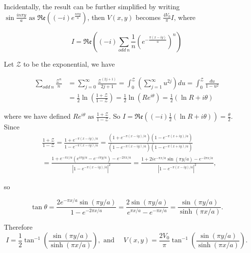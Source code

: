 \documentclass[a4paper,12pt]{report}
\begin{document}
\begin{example_template}
		Incidentally, the result can be further simplified by writing \(\sin \frac{in\pi y}{a} \text{ as } \mathfrak{Re} ((-i)e^{\frac{n\pi y}{a} } )  \), then \(V(x,y)\) becomes \(\frac{4V_0 }{\pi } I\), where
		
		\begin{equation}
			I = \mathfrak{Re} ((-i)\sum_{odd~n}^{} \frac{1}{n} (e^{-\frac{\pi (x-iy)}{a} } )^{n}) \end{equation}
		
		Let \(\mathcal{Z} \) to be the exponential, we have
		
		\begin{equation}
			\begin{aligned}
				\sum_{odd~n}^{} \frac{\mathcal{Z} ^{n} }{n} &= \sum_{j=0}^{\infty} \frac{\mathcal{Z} ^{(2j+1)} }{2j+1} = \int_{0}^{\mathcal{Z} } (\sum_{j=1}^{\infty} u^{2j} )du = \int_{0}^{\mathcal{Z} } \frac{du}{1-u^2} \\
				&= \frac{1}{2} \ln (\frac{1+\mathcal{Z} }{1-\mathcal{Z} } ) = \frac{1}{2}  \ln (R e^{i\theta } ) = \frac{1}{2} (\ln R + i\theta )
			\end{aligned}
		\end{equation}
		
		where we have defined \(R e^{i\theta } \text{ as } \frac{1+\mathcal{Z} }{1-\mathcal{Z} } \). So \(I =  \mathfrak{Re}  ((-i)\frac{1}{2} (\ln R + i\theta )) = \frac{\theta }{2}  \). Since 
		\begin{equation}
			\begin{aligned}
				&\frac{1+\mathcal{Z}}{1-\mathcal{Z}}=\frac{1+e^{-\pi(x-i y) / a}}{1-e^{-\pi(x-i y) / a}}=\frac{\left(1+e^{-\pi(x-i y) / a}\right)\left(1-e^{-\pi(x+i y) / a}\right)}{\left(1-e^{-\pi(x-i y) / a}\right)\left(1-e^{-\pi(x+i y) / a}\right)} \\
				& =\frac{1+e^{-\pi x / a}\left(e^{i \pi y / a}-e^{-i \pi y / a}\right)-e^{-2 \pi x / a}}{\left|1-e^{-\pi(x-i y) / a}\right|^2}=\frac{1+2 i e^{-\pi x / a} \sin (\pi y / a)-e^{-2 \pi x / a}}{\left|1-e^{-\pi(x-i y) / a}\right|^2},
			\end{aligned}
		\end{equation}
		
		so
		
		\begin{equation}
			\tan \theta=\frac{2 e^{-\pi x / a} \sin (\pi y / a)}{1-e^{-2 \pi x / a}}=\frac{2 \sin (\pi y / a)}{e^{\pi x / a}-e^{-\pi x / a}}=\frac{\sin (\pi y / a)}{\sinh (\pi x / a)}. 
		\end{equation}
		
		
		Therefore 
		\begin{equation}
			I=\frac{1}{2} \tan ^{-1}\left(\frac{\sin (\pi y / a)}{\sinh (\pi x / a)}\right), \text { and } \quad V(x, y)=\frac{2 V_0}{\pi} \tan ^{-1}\left(\frac{\sin (\pi y / a)}{\sinh (\pi x / a)}\right) .
		\end{equation}  
		
	\end{example_template}
	
\end{document}
